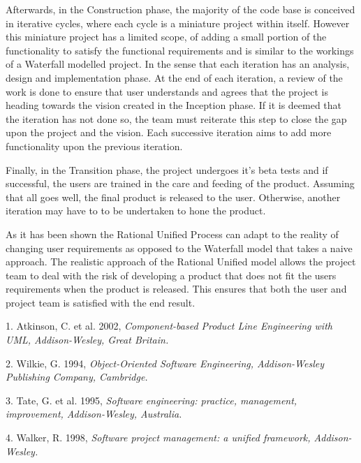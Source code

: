 Afterwards, in the Construction phase, the majority of the code base is conceived in iterative cycles, where each cycle is a miniature project within itself. However this miniature project has a limited scope, of adding a small portion of the functionality to satisfy the functional requirements and is similar to the workings of a Waterfall modelled project. In the sense that each iteration has an analysis, design and implementation phase. At the end of each iteration, a review of the work is done to ensure that user understands and agrees that the project is heading towards the vision created in the Inception phase. If it is deemed that the iteration has not done so, the team must reiterate this step to close the gap upon the project and the vision. Each successive iteration aims to add more functionality upon the previous iteration.

Finally, in the Transition phase, the project undergoes it's beta tests and if successful, the users are trained in the care and feeding of the product. Assuming that all goes well, the final product is released to the user. Otherwise, another iteration may have to to be undertaken to hone the product.

As it has been shown the Rational Unified Process can adapt to the reality of changing user requirements as opposed to the Waterfall model that takes a naive approach. The realistic approach of the Rational Unified model allows the project team to deal with the risk of developing a product that does not fit the users requirements when the product is released. This ensures that both the user and project team is satisfied with the end result.

\eject 

\item{1.} Atkinson, C. et al. 2002, \it Component-based Product Line Engineering with UML\rm, Addison-Wesley, Great Britain.
\item{2.} Wilkie, G. 1994, \it Object-Oriented Software Engineering\rm, Addison-Wesley Publishing Company, Cambridge.
\item{3.} Tate, G. et al. 1995, \it Software engineering: practice, management, improvement\rm, Addison-Wesley, Australia.
\item{4.} Walker, R. 1998, \it Software project management: a unified framework\rm, Addison-Wesley.

\bye
